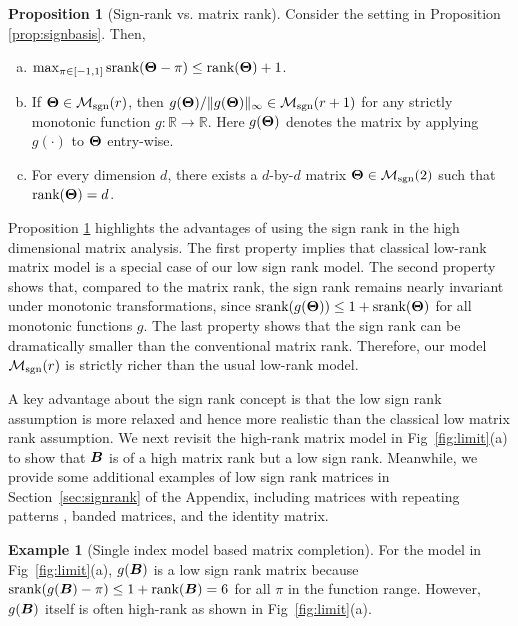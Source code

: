 \documentclass[aos]{imsart}
\theoremstyle{definition}
\newtheorem{proposition}{Proposition}
\newtheorem{example}{Example}
\def\srank{\textup{srank}}
\def\rank{\textup{rank}}
\def\caliM{\tM_{\textup{sgn}}}
\begin{document}
\begin{proposition}[Sign-rank vs. matrix rank]\label{prop:signrank} Consider the setting in Proposition \ref{prop:signbasis}. Then,
\begin{enumerate}[(a)]
\item $\max_{\pi\in[-1,1]}\srank(\mTheta-\pi)\leq \rank(\mTheta)+1$.
\item If $\mTheta \in \caliM(r)$, then $g(\mTheta)/\mnormSize{}{g(\mTheta)}\in\caliM(r+1)$ for any strictly monotonic function $g\colon \mathbb{R}\to\mathbb{R}$. Here $g(\bm{\Theta})$ denotes the matrix by applying $g(\cdot)$ to $\bm{\Theta}$ entry-wise. 
\item For every dimension $d$, there exists a $d$-by-$d$ matrix $\mTheta\in\caliM(2)$ such that $\rank(\mTheta)= d$.  
\end{enumerate}
\end{proposition}

\noindent
Proposition \ref{prop:signrank} highlights the advantages of using the sign rank in the high dimensional matrix analysis. The first property implies that classical low-rank matrix model is a special case of our low sign rank model. The second property shows that, compared to the matrix rank, the sign rank remains nearly invariant under monotonic transformations, since $\srank(g(\mTheta)) \leq 1+\srank(\mTheta)$ for all monotonic functions $g$. The last property shows that the sign rank can be dramatically smaller than the conventional matrix rank. Therefore, our model $\caliM(r)$ is strictly richer than the usual low-rank model. 

A key advantage about the sign rank concept is that the low sign rank assumption is more relaxed and hence more realistic than the classical low matrix rank assumption. We next revisit the high-rank matrix model in Fig~\ref{fig:limit}(a) to show that $\bm B$ is of a high matrix rank but a low sign rank. Meanwhile, we provide some additional examples of low sign rank matrices in Section~\ref{sec:signrank} of the Appendix, including matrices with repeating patterns \cite{chan2014consistent}, banded matrices, and the identity matrix.

\begin{example}[Single index model based matrix completion]
For the model in Fig~\ref{fig:limit}(a), $g(\bm B)$ is a low sign rank matrix because $\srank(g(\mB)-\pi)\leq 1+\rank(\mB)=6$ for all $\pi$ in the function range. However, $g(\bm B)$ itself is often high-rank as shown in Fig~\ref{fig:limit}(a).
\end{example}
\end{document}
